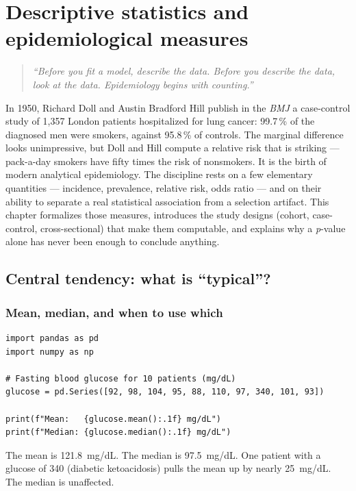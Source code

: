 \chapter{Descriptive statistics and epidemiological measures}
\label{ch:descriptive-epi}

\begin{quote}
\emph{``Before you fit a model, describe the data. Before you describe the data, look at the data. Epidemiology begins with counting.''}
\end{quote}

In 1950, Richard Doll and Austin Bradford Hill publish in the \emph{BMJ} a case-control study of 1{,}357 London patients hospitalized for lung cancer: 99.7\,\% of the diagnosed men were smokers, against 95.8\,\% of controls. The marginal difference looks unimpressive, but Doll and Hill compute a relative risk that is striking --- pack-a-day smokers have fifty times the risk of nonsmokers. It is the birth of modern analytical epidemiology. The discipline rests on a few elementary quantities --- incidence, prevalence, relative risk, odds ratio --- and on their ability to separate a real statistical association from a selection artifact. This chapter formalizes those measures, introduces the study designs (cohort, case-control, cross-sectional) that make them computable, and explains why a \emph{p}-value alone has never been enough to conclude anything.

\section{Central tendency: what is ``typical''?}

\subsection{Mean, median, and when to use which}

\begin{verbatim}
import pandas as pd
import numpy as np

# Fasting blood glucose for 10 patients (mg/dL)
glucose = pd.Series([92, 98, 104, 95, 88, 110, 97, 340, 101, 93])

print(f"Mean:   {glucose.mean():.1f} mg/dL")
print(f"Median: {glucose.median():.1f} mg/dL")
\end{verbatim}

The mean is 121.8~mg/dL. The median is 97.5~mg/dL. One patient with a glucose of 340 (diabetic ketoacidosis) pulls the mean up by nearly 25~mg/dL. The median is unaffected.

